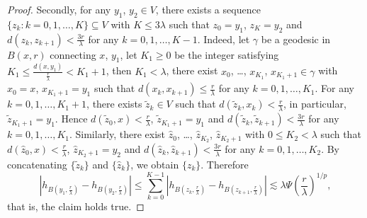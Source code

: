 \documentclass[11pt,a4paper]{article}
\numberwithin{equation}{section}
\theoremstyle{plain}
\theoremstyle{definition}
\begin{document}
\begin{proof}
Secondly, for any $y_1$, $y_2\in V$, there exists a sequence $\{z_k:k=0,1,\ldots, K\}\subseteq V$ with $K\le 3\lambda$ such that $z_0=y_1$, $z_K=y_2$ and $d(z_k,z_{k+1})<\frac{3r}{\lambda}$ for any $k=0,1,\ldots,K-1$. Indeed, let $\gamma$ be a geodesic in $B(x,r)$ connecting $x$, $y_1$, let $K_1\ge0$ be the integer satisfying $K_1\le \frac{d(x,y_1)}{\frac{r}{\lambda}}<K_1+1$, then $K_1<\lambda$, there exist ${x}_0$, \ldots, ${x}_{K_1}$, ${x}_{K_1+1}\in\gamma$ with $x_0=x$, $x_{K_1+1}=y_1$ such that $d(x_k,x_{k+1})\le \frac{r}{\lambda}$ for any $k=0,1,\ldots,K_1$. For any $k=0,1,\ldots,K_1+1$, there exists $\widetilde{z}_k\in V$ such that $d(\widetilde{z}_k,x_k)<\frac{r}{\lambda}$, in particular, $\widetilde{z}_{K_1+1}=y_1$. Hence $d(\widetilde{z}_0,x)<\frac{r}{\lambda}$, $\widetilde{z}_{K_1+1}=y_1$ and $d(\widetilde{z}_k,\widetilde{z}_{k+1})<\frac{3r}{\lambda}$ for any $k=0,1,\ldots,K_1$. Similarly, there exist $\widehat{z}_0$, \ldots, $\widehat{z}_{K_2}$, $\widehat{z}_{K_2+1}$ with $0\le K_2<\lambda$ such that $d(\widehat{z}_0,x)<\frac{r}{\lambda}$, $\widehat{z}_{K_2+1}=y_2$ and $d(\widehat{z}_k,\widehat{z}_{k+1})<\frac{3r}{\lambda}$ for any $k=0,1,\ldots,K_2$. By concatenating $\{\widetilde{z}_k\}$ and $\{\widehat{z}_k\}$, we obtain $\{z_k\}$. Therefore
$$|h_{B(y_1,\frac{r}{\lambda})}-h_{B(y_2,\frac{r}{\lambda})}|\le\sum_{k=0}^{K-1}|h_{B(z_k,\frac{r}{\lambda})}-h_{B(z_{k+1},\frac{r}{\lambda})}|\lesssim \lambda\Psi(\frac{r}{\lambda})^{1/p},$$
that is, the claim holds true.


\end{proof}
\end{document}
